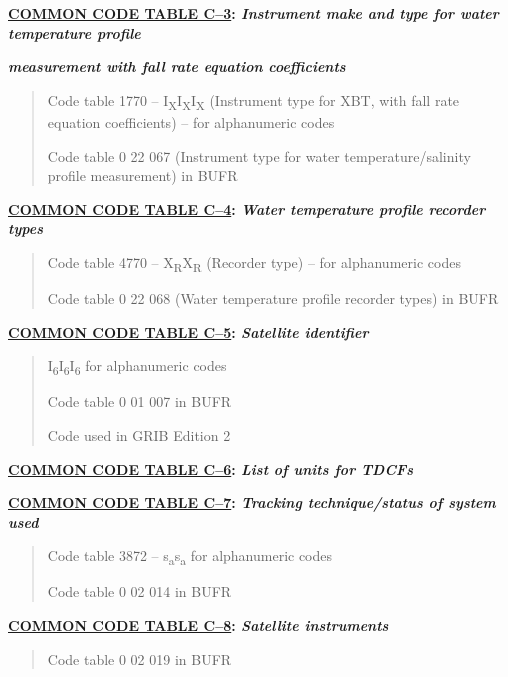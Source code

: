 \textbf{\href{WMO306_vI2_CommonTable_en.pdf}{COMMON CODE TABLE C--3}: \emph{Instrument make and type for water temperature profile}}

\emph{\textbf{measurement with fall rate equation coefficients}}

\begin{quote}
Code table 1770 -- I\textsubscript{X}I\textsubscript{X}I\textsubscript{X} (Instrument type for XBT, with fall rate equation coefficients) -- for alphanumeric codes

Code table 0 22 067 (Instrument type for water temperature/salinity profile measurement) in BUFR
\end{quote}

\textbf{\href{WMO306_vI2_CommonTable_en.pdf}{COMMON CODE TABLE C--4}: \emph{Water temperature profile recorder types}}

\begin{quote}
Code table 4770 -- X\textsubscript{R}X\textsubscript{R} (Recorder type) -- for alphanumeric codes

Code table 0 22 068 (Water temperature profile recorder types) in BUFR
\end{quote}

\textbf{\href{WMO306_vI2_CommonTable_en.pdf}{COMMON CODE TABLE C--5}: \emph{Satellite identifier}}

\begin{quote}
I\textsubscript{6}I\textsubscript{6}I\textsubscript{6} for alphanumeric codes

Code table 0 01 007 in BUFR

Code used in GRIB Edition 2
\end{quote}

\textbf{\href{WMO306_vI2_CommonTable_en.pdf}{COMMON CODE TABLE C--6}: \emph{List of units for TDCFs}}

\textbf{\href{WMO306_vI2_CommonTable_en.pdf}{COMMON CODE TABLE C--7}: \emph{Tracking technique/status of system used}}

\begin{quote}
Code table 3872 -- s\textsubscript{a}s\textsubscript{a} for alphanumeric codes

Code table 0 02 014 in BUFR
\end{quote}

\textbf{\href{WMO306_vI2_CommonTable_en.pdf}{COMMON CODE TABLE C--8}: \emph{Satellite instruments}}

\begin{quote}
Code table 0 02 019 in BUFR
\end{quote}

